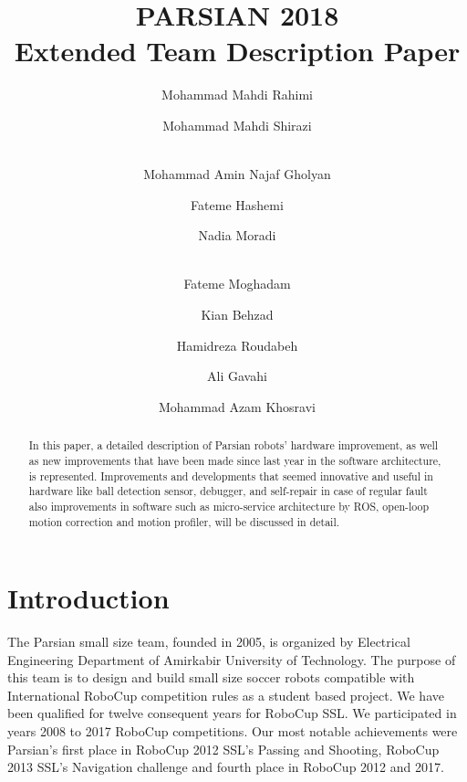 \documentclass{llncs}
\begin{document}
\title{PARSIAN 2018\\Extended Team Description Paper}
%
%
\author{Mohammad Mahdi Rahimi \and Mohammad Mahdi Shirazi \and \\
Mohammad Amin Najaf Gholyan \and Fateme Hashemi  \and Nadia Moradi \and \\ Fateme Moghadam \and Kian Behzad \and Hamidreza Roudabeh \and Ali Gavahi \and Mohammad Azam Khosravi}
%
%
%

\maketitle              %

\begin{abstract}
In this paper, a detailed description of Parsian robots' hardware improvement, as well as new improvements that have been made since last year in the software architecture, is represented. Improvements and developments that seemed innovative and useful in hardware like ball detection sensor, debugger, and self-repair in case of regular fault also improvements in software such as micro-service architecture by ROS, open-loop motion correction and motion profiler, will be discussed in detail.
\end{abstract}
%
\section{Introduction}
%
The Parsian small size team, founded in 2005, is organized by Electrical Engineering Department of Amirkabir University of Technology. The purpose of this team is to design and build small size soccer robots compatible with International RoboCup competition rules as a student based project. We have been qualified for twelve consequent years for RoboCup SSL. We participated in years 2008 to 2017 RoboCup competitions. Our most notable achievements were Parsian's first place in RoboCup 2012 SSL's Passing and Shooting, RoboCup 2013 SSL's Navigation challenge and fourth place in RoboCup 2012 and 2017.
\end{document}
